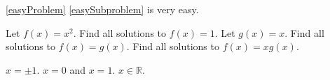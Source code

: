 \documentclass{article}
\begin{document}
    \createtitle
    \ref{easyProblem} \ref{easySubproblem} is very easy.

    \begin{problem}
	\label{easyProblem}
	Let $f(x) = x^2$.
	\subproblem \label{easySubproblem} Find all solutions to $f(x) = 1$.
	\exitsubproblems
	Let $g(x) = x$.
	\subproblem Find all solutions to $f(x) = g(x)$.
	\subproblem Find all solutions to $f(x) = x g(x)$.
    \end{problem}

    \newpageifproblems

    \begin{solution}
	\subproblem $x = \pm 1$.
	\subproblem $x = 0$ and $x = 1$.
	\subproblem $x \in \mathbb{R}$.
    \end{solution}
\end{document}
